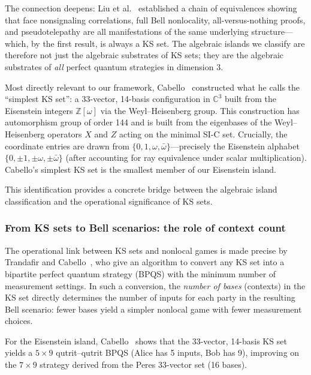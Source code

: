 \documentclass[12pt,a4paper]{article}
\newcommand{\C}{\mathbb{C}}
\newcommand{\Z}{\mathbb{Z}}
\begin{document}
The connection deepens: Liu et al.~\cite{Cabello2024equivalences} established a chain of equivalences showing that face nonsignaling correlations, full Bell nonlocality, all-versus-nothing proofs, and pseudotelepathy are all manifestations of the same underlying structure---which, by the first result, is always a KS set. The algebraic islands we classify are therefore not just the algebraic substrates of KS sets; they are the algebraic substrates of \emph{all} perfect quantum strategies in dimension 3.

Most directly relevant to our framework, Cabello~\cite{Cabello2025simplest} constructed what he calls the ``simplest KS set'': a 33-vector, 14-basis configuration in $\C^3$ built from the Eisenstein integers $\Z[\omega]$ via the Weyl--Heisenberg group. This construction has automorphism group of order 144 and is built from the eigenbases of the Weyl--Heisenberg operators $X$ and $Z$ acting on the minimal SI-C set. Crucially, the coordinate entries are drawn from $\{0, 1, \omega, \bar\omega\}$---precisely the Eisenstein alphabet $\{0, \pm 1, \pm\omega, \pm\bar\omega\}$ (after accounting for ray equivalence under scalar multiplication). Cabello's simplest KS set is the smallest member of our Eisenstein island.

This identification provides a concrete bridge between the algebraic island classification and the operational significance of KS sets.

\subsubsection{From KS sets to Bell scenarios: the role of context count}\label{sec:ks-bell}

The operational link between KS sets and nonlocal games is made precise by Trandafir and Cabello~\cite{TrandafirCabello2025optimal}, who give an algorithm to convert any KS set into a bipartite perfect quantum strategy (BPQS) with the minimum number of measurement settings. In such a conversion, the \emph{number of bases} (contexts) in the KS set directly determines the number of inputs for each party in the resulting Bell scenario: fewer bases yield a simpler nonlocal game with fewer measurement choices.

For the Eisenstein island, Cabello~\cite{Cabello2025simplest} shows that the 33-vector, 14-basis KS set yields a $5 \times 9$ qutrit--qutrit BPQS (Alice has 5 inputs, Bob has 9), improving on the $7 \times 9$ strategy derived from the Peres 33-vector set (16 bases).
\end{document}

